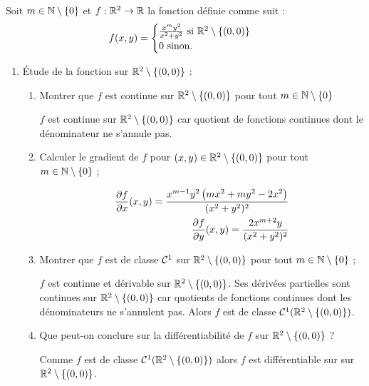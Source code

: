 \documentclass[a4paper]{article}
\begin{document}
Soit $m\in \mathbb{N}\setminus \left\{ 0 \right\}$ et $f : \mathbb{R}^2 \to \mathbb{R}$ la fonction définie comme suit :
\[
	f(x,y) = \begin{cases}
		\frac{x^m y^2}{x^2 + y^2} \text{ si } \mathbb{R}^2 \setminus \{ (0, 0) \} \\
		0 \text{ sinon}.
	\end{cases}
\]

\begin{enumerate}
	\item  Étude de la fonction sur $\mathbb{R}^2 \setminus \{ (0, 0) \}$ :
		\begin{enumerate}
			\item Montrer que $f$ est continue sur $\mathbb{R}^2 \setminus \{ (0,0) \}$ pour tout $m \in \mathbb{N}\setminus \left\{ 0 \right\}$ 
	\medskip 

$f$ est continue sur $\mathbb{R}^2 \setminus \{ (0,0) \}$ car quotient de fonctions continues dont le dénominateur ne s’annule pas.
\medskip

			\item Calculer le gradient de $f$ pour $(x, y) \in \mathbb{R}^2 \setminus \{ (0, 0) \}$ pour tout $m \in \mathbb{N}\setminus \left\{ 0 \right\}$ ;
				
				\medskip

				\begin{align*}
					\frac{\partial f}{\partial x} (x,y) = \frac{x^{m-1} y^2 \left( mx^2 + my^2 -2x^2\right)}{ (x^2+y^2)^2} \\
					\frac{\partial f}{\partial y} (x,y) = \frac{2 x^{m+2} y }{ (x^2+y^2)^2}
				\end{align*}
	\medskip		
			\item Montrer que $f$ est de classe $\mathcal{C}^{1}$ sur $\mathbb{R}^2 \setminus \{ (0, 0) \}$ pour tout $m \in \mathbb{N}\setminus \left\{ 0 \right\}$ ;

				\medskip

$f$ est continue et dérivable sur $\mathbb{R}^2 \setminus \{ (0, 0) \}$. Ses dérivées partielles sont continues sur $\mathbb{R}^2 \setminus \{ (0, 0) \}$ car quotients de
fonctions continues dont les dénominateurs ne s'annulent pas. Alors $f$ est de classe $\mathcal{C}^1 (\mathbb{R}^2 \setminus \{ (0, 0) \} )$.

\medskip

			\item Que peut-on conclure sur la différentiabilité de $f$ sur $\mathbb{R}^2 \setminus \{ (0, 0) \}$ ?

\medskip

Comme $f$ est de classe $\mathcal{C}^1 (\mathbb{R}^2 \setminus \{ (0, 0) \} )$ alors $f$ est différentiable sur sur $\mathbb{R}^2 \setminus \{ (0, 0) \} $.


\end{enumerate}
\end{enumerate}
\end{document}
